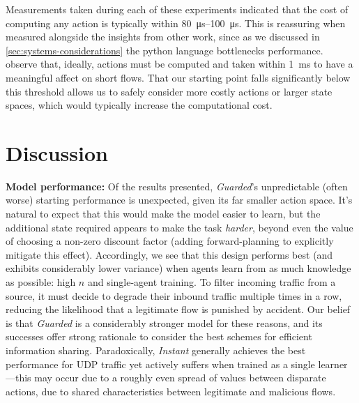 \documentclass[10pt, times, conference, letterpaper]{IEEEtran}
\newcommand{\fakepara}[1]{\noindent\textbf{#1:}}
\begin{document}
Measurements taken during each of these experiments indicated that the cost of computing any action is typically within \SIrange{80}{100}{\micro\second}.
This is reassuring when measured alongside the insights from other work, since as we discussed in \cref{sec:systems-considerations} the python language bottlenecks performance.
\Textcite{DBLP:conf/sigcomm/ChenL0L18} observe that, ideally, actions must be computed and taken within \SI{1}{\milli\second} to have a meaningful affect on short flows.
That our starting point falls significantly below this threshold allows us to safely consider more costly actions or larger state spaces, which would typically increase the computational cost.

\section{Discussion}\label{sec:discussion}



\fakepara{Model performance}
Of the results presented, \emph{Guarded}'s unpredictable (often worse) starting performance is unexpected, given its far smaller action space.
It's natural to expect that this would make the model easier to learn, but the additional state required appears to make the task \emph{harder}, beyond even the value of choosing a non-zero discount factor (adding forward-planning to explicitly mitigate this effect).
Accordingly, we see that this design performs best (and exhibits considerably lower variance) when agents learn from as much knowledge as possible: high $n$ and single-agent training.
To filter incoming traffic from a source, it must decide to degrade their inbound traffic multiple times in a row, reducing the likelihood that a legitimate flow is punished by accident.
Our belief is that \emph{Guarded} is a considerably stronger model for these reasons, and its successes offer strong rationale to consider the best schemes for efficient information sharing.
Paradoxically, \emph{Instant} generally achieves the best performance for UDP traffic yet actively suffers when trained as a single learner---this may occur due to a roughly even spread of values between disparate actions, due to shared characteristics between legitimate and malicious flows.
\end{document}
